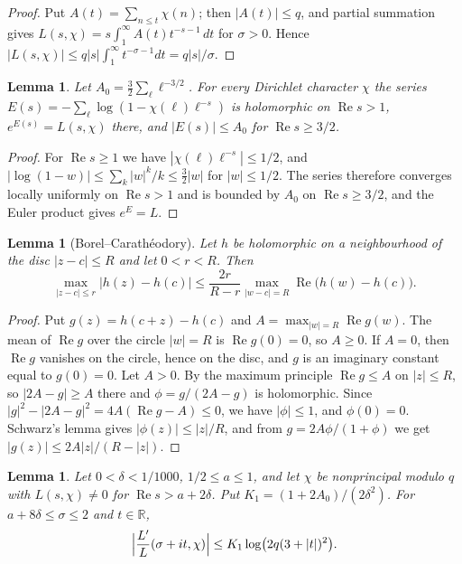 \documentclass{aomart}
\numberwithin{equation}{section}
\newtheorem{lemma}[theorem]{Lemma}
\theoremstyle{definition}
\renewcommand{\Re}{\operatorname{Re}}
\newcommand{\R}{\mathbb{R}}
\begin{document}
\begin{proof}
Put $A(t)=\sum_{n\le t}\chi(n)$; then $|A(t)|\le q$, and partial summation gives
$L(s,\chi)=s\int_1^\infty A(t)t^{-s-1}\,dt$ for $\sigma>0$. Hence
$|L(s,\chi)|\le q|s|\int_1^\infty t^{-\sigma-1}dt=q|s|/\sigma$.
\end{proof}

\begin{lemma}\label{lem:euler}
Let $A_0=\frac32\sum_\ell\ell^{-3/2}$. For every Dirichlet character $\chi$ the series
$E(s)=-\sum_\ell\log(1-\chi(\ell)\ell^{-s})$ is holomorphic on $\Re s>1$, $e^{E(s)}=L(s,\chi)$
there, and $|E(s)|\le A_0$ for $\Re s\ge3/2$.
\end{lemma}

\begin{proof}
For $\Re s\ge1$ we have $|\chi(\ell)\ell^{-s}|\le1/2$, and $|\log(1-w)|\le\sum_k|w|^k/k
\le\frac32|w|$ for $|w|\le1/2$. The series therefore converges locally uniformly on $\Re s>1$
and is bounded by $A_0$ on $\Re s\ge3/2$, and the Euler product gives $e^E=L$.
\end{proof}

\begin{lemma}[Borel--Carath\'eodory]\label{lem:bc}
Let $h$ be holomorphic on a neighbourhood of the disc $|z-c|\le R$ and let $0<r<R$. Then
\[
  \max_{|z-c|\le r}|h(z)-h(c)|\le\frac{2r}{R-r}\max_{|w-c|=R}\Re\bigl(h(w)-h(c)\bigr).
\]
\end{lemma}

\begin{proof}
Put $g(z)=h(c+z)-h(c)$ and $A=\max_{|w|=R}\Re g(w)$. The mean of $\Re g$ over the circle
$|w|=R$ is $\Re g(0)=0$, so $A\ge0$. If $A=0$, then $\Re g$ vanishes on the circle, hence on the
disc, and $g$ is an imaginary constant equal to $g(0)=0$. Let $A>0$. By the maximum principle
$\Re g\le A$ on $|z|\le R$, so $|2A-g|\ge A$ there and $\phi=g/(2A-g)$ is holomorphic. Since
$|g|^2-|2A-g|^2=4A(\Re g-A)\le0$, we have $|\phi|\le1$, and $\phi(0)=0$. Schwarz's lemma gives
$|\phi(z)|\le|z|/R$, and from $g=2A\phi/(1+\phi)$ we get $|g(z)|\le2A|z|/(R-|z|)$.
\end{proof}

\begin{lemma}\label{lem:logderiv}
Let $0<\delta<1/1000$, $1/2\le a\le1$, and let $\chi$ be nonprincipal modulo $q$ with
$L(s,\chi)\ne0$ for $\Re s>a+2\delta$. Put $K_1=(1+2A_0)/(2\delta^2)$. For
$a+8\delta\le\sigma\le2$ and $t\in\R$,
\[
  \Bigl|\frac{L'}{L}(\sigma+it,\chi)\Bigr|\le K_1\log\bigl(2q(3+|t|)^2\bigr).
\]
\end{lemma}
\end{document}
